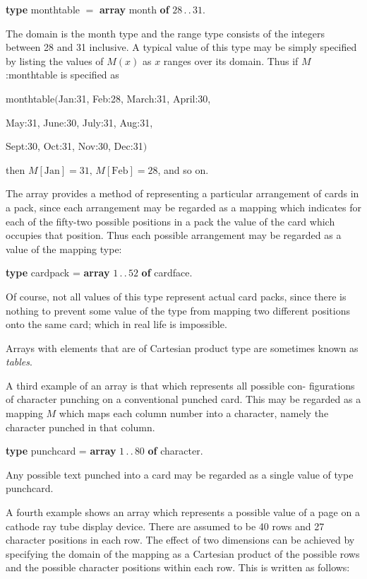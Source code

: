 \quad \textbf{type} monthtable $=$ \textbf{array} month \textbf{of} $28\,.\,.\,31$.

\noindent
The domain is the month type and the range type consists of the integers between 28 and 31 inclusive. A typical value of this type may be simply specified by listing the values of $M(x)$ as $x$ ranges over its domain. Thus if $M$:monthtable is specified as

\quad monthtable$($Jan:31, Feb:28, March:31, April:30,

\quad May:31, June:30, July:31, Aug:31,

\quad Sept:30, Oct:31, Nov:30, Dec:31$)$

\noindent
then $M[\text{Jan}] = 31,\, M[\text{Feb}] = 28$, and so on.

The array provides a method of representing a particular arrangement of cards in a pack, since each arrangement may be regarded as a mapping which indicates for each of the fifty-two possible positions in a pack the value of the card which occupies that position. Thus each possible arrangement may be regarded as a value of the mapping type:

\quad \textbf{type} cardpack = \textbf{array} $1\,.\,.\,52$ \textbf{of} cardface.

\noindent
Of course, not all values of this type represent actual card packs, since there is nothing to prevent some value of the type from mapping two different positions onto the same card; which in real life is impossible.

Arrays with elements that are of Cartesian product type are sometimes known as \textit{tables}.

A third example of an array is that which represents all possible con- figurations of character punching on a conventional punched card. This may be regarded as a mapping $M$ which maps each column number into a character, namely the character punched in that column.

\quad \textbf{type} punchcard = \textbf{array} $1\,.\,.\,80$ \textbf{of} character.

\noindent
Any possible text punched into a card may be regarded as a single value of type punchcard.

A fourth example shows an array which represents a possible value of a page on a cathode ray tube display device. There are assumed to be 40 rows and 27 character positions in each row. The effect of two dimensions can be achieved by specifying the domain of the mapping as a Cartesian product of the possible rows and the possible character positions within each row. This is written as follows:

